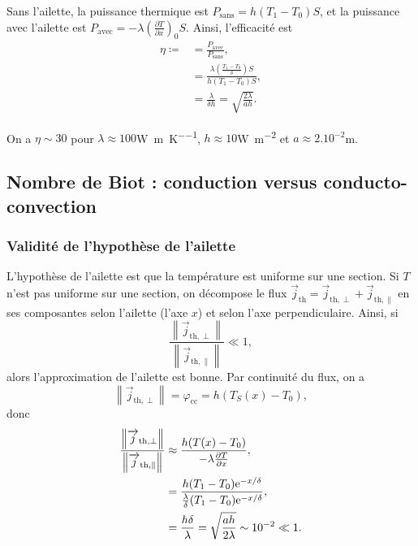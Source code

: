             Sans l'ailette, la puissance thermique est $P_{\text{sans}}=h(T_1-T_0)S$, et la puissance avec l'ailette est $P_{\text{avec}}=-\lambda\left(\frac{\partial T}{\partial x}\right)_{0}S$. Ainsi, l'efficacité est 
            \begin{align*}
                \eta\coloneqq
                &=
                \frac{P_{\text{avec}}}{P_{\text{sans}}},\\
                &=
                \frac{\lambda\left(\frac{T_1-T_0}{\delta}\right)S}{h(T_1-T_0)S},\\
                &=
                \frac{\lambda}{\delta h}=\sqrt{\frac{2\lambda}{ah}}.
            \end{align*}

            On a $\eta\sim 30$ pour $\lambda\approx100$\si[]{\watt\per\metre\per\kelvin}, $h\approx10$\si[]{\watt\per\metre\squared} et $a\approx2.10^{-2}$\si[]{\metre}.

    \subsection[Nombre de Biot]{Nombre de Biot : conduction versus conducto-convection}
        \subsubsection{Validité de l'hypothèse de l'ailette}
            L'hypothèse de l'ailette est que la température est uniforme sur une section. Si $T$ n'est pas uniforme sur une section, on décompose le flux $\vec{j}_{\text{th}}=\vec{j}_{\text{th},\perp}+\vec{j}_{\text{th},\parallel}$ en ses composantes selon l'ailette (l'axe $x$) et selon l'axe perpendiculaire. Ainsi, si 
            \begin{equation*}
                \frac{\left\lVert\vec{j}_{\text{th},\perp}\right\rVert}{\left\lVert\vec{j}_{\text{th},\parallel}\right\rVert}\ll1,
            \end{equation*}
            alors l'approximation de l'ailette est bonne. Par continuité du flux, on a 
            \begin{equation*}
                \left\lVert\vec{j}_{\text{th},\perp}\right\rVert=\varphi_{\text{cc}}=h(T_S(x)-T_0),
            \end{equation*}
            donc
            \begin{align*}
                \frac{\left\lVert\protect\overrightarrow{{j}}_{\text{th},\perp}\right\rVert}{\left\lVert\protect\overrightarrow{{j}}_{\text{th},\parallel}\right\rVert}
                &\approx
                \frac{h(T(x)-T_0)}{-\lambda\frac{\partial T}{\partial x}},\\
                &=
                \frac{h(T_1-T_0)\mathrm{e}^{-x/\delta}}{\frac{\lambda}{\delta}(T_1-T_0)\mathrm{e}^{-x/\delta}},\\
                &=
                \frac{h\delta}{\lambda}=\sqrt{\frac{ah}{2\lambda}}\sim10^{-2}\ll1.
            \end{align*}

